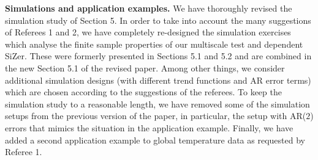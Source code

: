 \documentclass[a4paper,12pt]{article}
\begin{document}
\newpage
\textbf{Simulations and application examples.} We have thoroughly revised the simulation study of Section 5. In order to take into account the many suggestions of Referees 1 and 2, we have completely re-designed the simulation exercises which analyse the finite sample properties of our multiscale test and dependent SiZer. These were formerly presented in Sections 5.1 and 5.2 and are combined in the new Section 5.1 of the revised paper. 
Among other things, we consider additional simulation designs (with different trend functions and AR error terms) which are chosen according to the suggestions of the referees. To keep the simulation study to a reasonable length, we have removed some of the simulation setups from the previous version of the paper, in particular, the setup with AR($2$) errors that mimics the situation in the application example. Finally, we have added a second application example to global temperature data as requested by Referee 1. 


\end{document}
